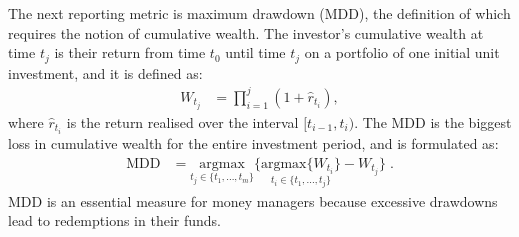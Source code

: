 \documentclass[a4paper,11pt,nocenter,bold,noupper,headcount]{mythesis}
\theoremstyle{plain}
\theoremstyle{definition}
\begin{document}
The next reporting metric is maximum drawdown (MDD), the definition of which requires the notion of cumulative wealth. The investor's cumulative wealth at time $t_j$ is their return from time $t_0$ until time $t_j$ on a portfolio of one initial unit investment, and it is defined as:
\begin{align*}
W_{t_j} &= \prod_{i = 1}^{j} (1 + \hat{r}_{t_i}), 
\end{align*}
where $\hat{r}_{t_i}$ is the return realised over the interval $[t_{i - 1}, t_i)$. The MDD is the biggest loss in cumulative wealth for the entire investment period, and is formulated as:
\begin{align}
\text{MDD} & = \underset{t_j \in \{t_1, ..., t_m\}}{\text{argmax}} \Big \{ \underset{t_i \in \{t_1, ..., t_j\}}{\text{argmax} \{W_{t_i} \}} - W_{t_j}  \Big \} \; .
\end{align} 
MDD is an essential measure for money managers because excessive drawdowns lead to redemptions in their funds. \citep{M04}
\end{document}

